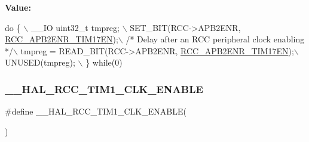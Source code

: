 {\bfseries Value\+:}
\begin{DoxyCode}
\textcolor{keywordflow}{do} \{ \(\backslash\)
                                        \_\_IO uint32\_t tmpreg; \(\backslash\)
                                        SET\_BIT(RCC->APB2ENR, 
      \hyperlink{group___peripheral___registers___bits___definition_ga29e566fb62e24640c55693324801d87c}{RCC\_APB2ENR\_TIM17EN});\(\backslash\)
                                        \textcolor{comment}{/* Delay after an RCC peripheral clock enabling */}\(\backslash\)
                                        tmpreg = READ\_BIT(RCC->APB2ENR, 
      \hyperlink{group___peripheral___registers___bits___definition_ga29e566fb62e24640c55693324801d87c}{RCC\_APB2ENR\_TIM17EN});\(\backslash\)
                                        UNUSED(tmpreg); \(\backslash\)
                                      \} \textcolor{keywordflow}{while}(0)
\end{DoxyCode}
\mbox{\label{group___r_c_c___a_p_b2___clock___enable___disable_gad693d7300ed7134b60bb1a645e762358}} 
\subsubsection{\texorpdfstring{\+\_\+\+\_\+\+H\+A\+L\+\_\+\+R\+C\+C\+\_\+\+T\+I\+M1\+\_\+\+C\+L\+K\+\_\+\+E\+N\+A\+B\+LE}{\_\_HAL\_RCC\_TIM1\_CLK\_ENABLE}}
{\footnotesize\ttfamily \#define \+\_\+\+\_\+\+H\+A\+L\+\_\+\+R\+C\+C\+\_\+\+T\+I\+M1\+\_\+\+C\+L\+K\+\_\+\+E\+N\+A\+B\+LE(\begin{DoxyParamCaption}{ }\end{DoxyParamCaption})}

